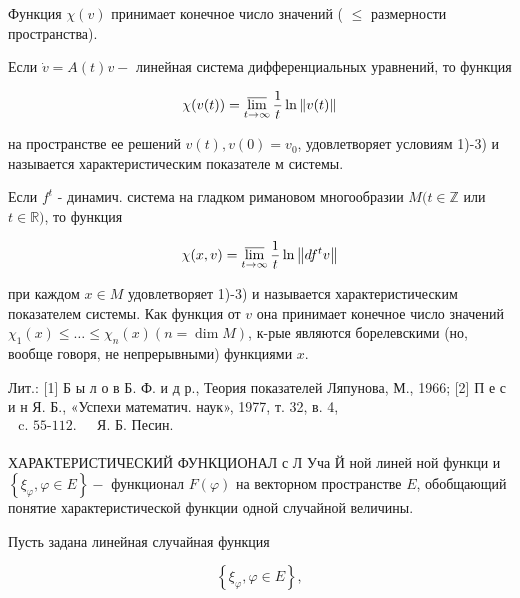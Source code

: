 \documentclass[10pt]{article}
\begin{document}
Функция $\chi(v)$ принимает конечное число значений ( $\leqslant$ размерности пространства).



Если $\dot{v}=A(t) v-$ линейная система дифференциальных уравнений, то функция



\[

\chi(v(t))=\varlimsup_{t \rightarrow \infty} \frac{1}{t} \ln \|v(t)\|

\]



на пространстве ее решений $v(t), v(0)=v_{0}$, удовлетворяет условиям 1)-3) и называется характеристическим показателе м системы.



Если $f^{t}$ - динамич. система на гладком римановом многообразии $M(t \in \mathbb{Z}$ или $t \in \mathbb{R})$, то функция



\[

\chi(x, v)=\varlimsup_{t \rightarrow \infty} \frac{1}{t} \ln \left\|d f^{t} v\right\|

\]



при каждом $x \in M$ удовлетворяет 1)-3) и называется характеристическим показателем системы. Как функция от $v$ она принимает конечное число значений $\chi_{1}(x) \leqslant \ldots \leqslant \chi_{n}(x)(n=\operatorname{dim} M)$, к-рые являются борелевскими (но, вообще говоря, не непрерывными) функциями $x$.



Лит.: [1] Б ы л о в Б. Ф. и д р., Теория показателей Ляпунова, М., 1966; [2] П е с и н Я. Б., «Успехи математич. наук», 1977, т. 32, в. 4, $\begin{array}{lll}\text { c. 55-112. } & \text { Я. Б. Песин. } \\ & \end{array}$



ХАРАКТЕРИСТИЧЕСКИЙ ФУНКЦИОНАЛ с Л Уча Й ной линей ной функци и $\left\{\xi_{\varphi}, \varphi \in E\right\}-$ функционал $F(\varphi)$ на векторном пространстве $E$, обобщающий понятие характеристической функции одной случайной величины.



Пусть задана линейная случайная функция



\[

\left\{\xi_{\varphi}, \varphi \in E\right\},

\]
\end{document}
